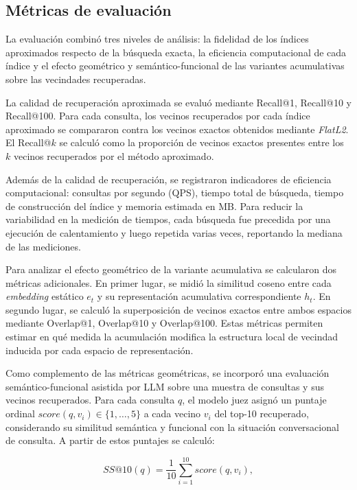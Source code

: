 \documentclass[runningheads]{llncs}
\begin{document}
\subsection{Métricas de evaluación}

La evaluación combinó tres niveles de análisis: la fidelidad de los índices aproximados respecto de la búsqueda exacta, la eficiencia computacional de cada índice y el efecto geométrico y semántico-funcional de las variantes acumulativas sobre las vecindades recuperadas.

La calidad de recuperación aproximada se evaluó mediante Recall@1, Recall@10 y Recall@100. Para cada consulta, los vecinos recuperados por cada índice aproximado se compararon contra los vecinos exactos obtenidos mediante \textit{FlatL2}. El Recall@$k$ se calculó como la proporción de vecinos exactos presentes entre los $k$ vecinos recuperados por el método aproximado.

Además de la calidad de recuperación, se registraron indicadores de eficiencia computacional: consultas por segundo (QPS), tiempo total de búsqueda, tiempo de construcción del índice y memoria estimada en MB. Para reducir la variabilidad en la medición de tiempos, cada búsqueda fue precedida por una ejecución de calentamiento y luego repetida varias veces, reportando la mediana de las mediciones.

Para analizar el efecto geométrico de la variante acumulativa se calcularon dos métricas adicionales. En primer lugar, se midió la similitud coseno entre cada \textit{embedding} estático $e_t$ y su representación acumulativa correspondiente $h_t$. En segundo lugar, se calculó la superposición de vecinos exactos entre ambos espacios mediante Overlap@1, Overlap@10 y Overlap@100. Estas métricas permiten estimar en qué medida la acumulación modifica la estructura local de vecindad inducida por cada espacio de representación.

Como complemento de las métricas geométricas, se incorporó una evaluación semántico-funcional asistida por LLM sobre una muestra de consultas y sus vecinos recuperados. Para cada consulta $q$, el modelo juez asignó un puntaje ordinal $score(q,v_i) \in \{1,\ldots,5\}$ a cada vecino $v_i$ del top-10 recuperado, considerando su similitud semántica y funcional con la situación conversacional de consulta. A partir de estos puntajes se calculó:

\begin{equation}
    SS@10(q)=\frac{1}{10}\sum_{i=1}^{10} score(q,v_i),
\end{equation}
\end{document}
